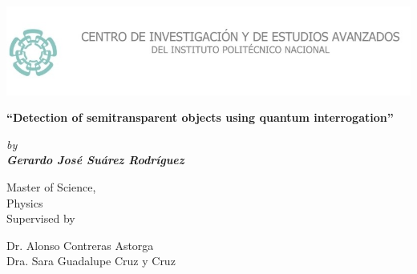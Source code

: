 \documentclass[12pt]{book}
\begin{document}
\newcommand\numberthis{\addtocounter{equation}{1}\tag{\theequation}}

\raggedbottom


\thispagestyle{empty}
\setlength\headheight{0pt} 
\begin{center}

\begin{center}
\includegraphics[width=1\linewidth]{images/logo.jpg}            
\end{center}    

  \vspace{3 cm}

        {\Large\bfseries  ``Detection of semitransparent objects using quantum interrogation''\par}

        \vspace{0.5cm}
        {\Large\itshape by \\ \bfseries Gerardo José Suárez Rodríguez \par \par}
        

\vspace{2cm}


Master of Science, \\ Physics\\
Supervised by\par
Dr. Alonso Contreras Astorga  \\
Dra. Sara Guadalupe Cruz y Cruz\\




\end{center}

\clearpage

\tableofcontents
{}
\pagebreak
{}
\end{document}
